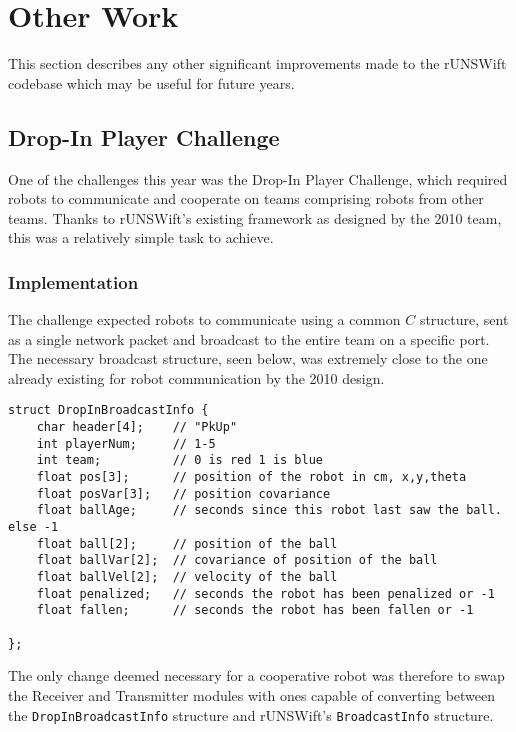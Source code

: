 \chapter{Other Work}
\label{chap:misc}

This section describes any other significant improvements made to the rUNSWift codebase which may be useful for future years.

\section{Drop-In Player Challenge}

One of the challenges this year was the Drop-In Player Challenge, which required robots to communicate and cooperate on teams comprising robots from other teams. Thanks to rUNSWift's existing framework as designed by the 2010 team\cite{runswift_2010}, this was a relatively simple task to achieve.

\subsection{Implementation}

The challenge expected robots to communicate using a common $C$ structure, sent as a single network packet and broadcast to the entire team on a specific port. The necessary broadcast structure, seen below, was extremely close to the one already existing for robot communication by the 2010 design. 

\begin{lstlisting}
struct DropInBroadcastInfo {
    char header[4];    // "PkUp"
    int playerNum;     // 1-5
    int team;          // 0 is red 1 is blue
    float pos[3];      // position of the robot in cm, x,y,theta
    float posVar[3];   // position covariance
    float ballAge;     // seconds since this robot last saw the ball. else -1
    float ball[2];     // position of the ball
    float ballVar[2];  // covariance of position of the ball
    float ballVel[2];  // velocity of the ball
    float penalized;   // seconds the robot has been penalized or -1
    float fallen;      // seconds the robot has been fallen or -1

};
\end{lstlisting}

The only change deemed necessary for a cooperative robot was therefore to swap the Receiver and Transmitter modules with ones capable of converting between the \texttt{DropInBroadcastInfo} structure and rUNSWift's \texttt{BroadcastInfo} structure.


